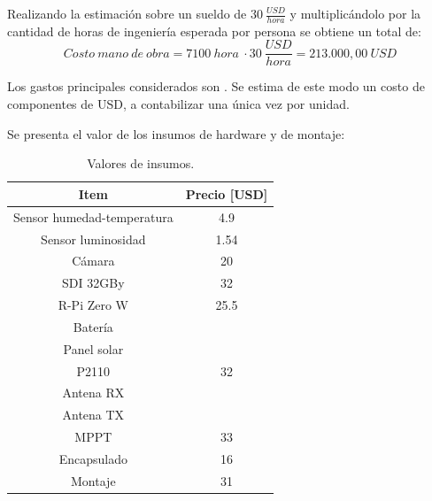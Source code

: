 Realizando la estimación sobre un sueldo de $30 \ \frac{USD}{hora}$ y multiplicándolo por la cantidad de horas de ingeniería esperada por persona se obtiene un total de: $$Costo \ mano \ de \ obra = 7100 \ hora \ \cdot 30 \ \frac{USD}{hora} = 213.000,00 \ USD$$



Los gastos principales considerados son \TBD. %
Se estima de este modo un costo de componentes de \TBD USD, a contabilizar una única vez por unidad.

Se presenta el valor de los insumos de hardware y de montaje:
\begin{table}[H]
\centering
\begin{tabular}{|c|c|}
\hline
\textbf{Item}                                                         & \textbf{Precio [USD]}				  \\ \hline
Sensor humedad-temperatura 											  & 4.9                                   \\ \hline
Sensor luminosidad                                                    & 1.54                                  \\ \hline
Cámara                                                                & 20                                    \\ \hline
SDI 32GBy                                                             & 32                                    \\ \hline
R-Pi Zero W                                                           & 25.5                                  \\ \hline
Batería                                                               & \TBD                   				  \\ \hline
Panel solar                                                           & \TBD                   				  \\ \hline
P2110                                                                 & 32                                    \\ \hline
Antena RX                                                             & \TBD                   				  \\ \hline
Antena TX                                                             & \TBD                   				  \\ \hline
MPPT                                                                  & 33                                    \\ \hline
Encapsulado                                                           & 16                                    \\ \hline
Montaje                                                               & 31                                    \\ \hline
\end{tabular}
\caption{Valores de insumos.}
\end{table}


